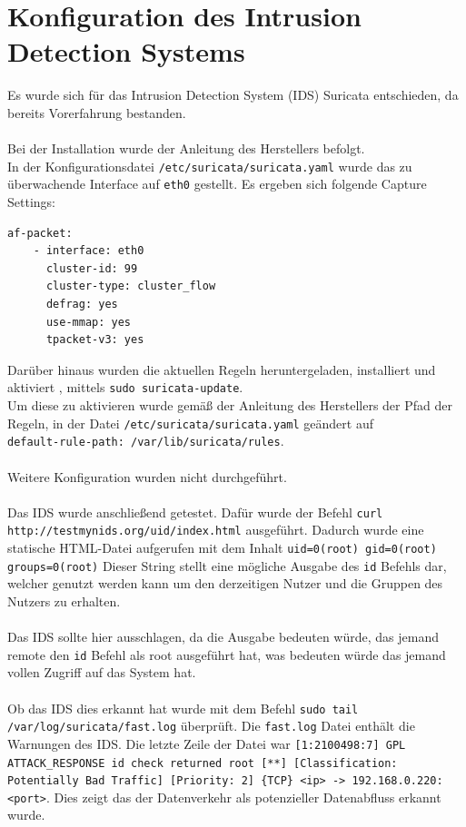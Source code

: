 \documentclass[
    a4paper,
    pagesize,
	pdftex,
    12pt,
]{scrartcl}
\begin{document}
\section{Konfiguration des Intrusion Detection Systems}\label{config-ids}
Es wurde sich für das Intrusion Detection System (IDS) Suricata entschieden, da bereits Vorerfahrung bestanden. \\ \\
Bei der Installation wurde der Anleitung des Herstellers \cite{suricata-quickstart} befolgt. \\
In der Konfigurationsdatei \lstinline[breaklines]|/etc/suricata/suricata.yaml| wurde das zu überwachende Interface auf \lstinline[breaklines]|eth0| gestellt. Es ergeben sich folgende Capture Settings:
\begin{lstlisting}[breaklines]
af-packet:
	- interface: eth0
	  cluster-id: 99
	  cluster-type: cluster_flow
	  defrag: yes
	  use-mmap: yes
	  tpacket-v3: yes
\end{lstlisting}
Darüber hinaus wurden die aktuellen Regeln heruntergeladen, installiert und aktiviert \cite{suricata-rulemanagement}, mittels \lstinline[breaklines]|sudo suricata-update|. \\
Um diese zu aktivieren wurde gemäß der Anleitung des Herstellers der Pfad der Regeln, in der Datei \lstinline[breaklines]|/etc/suricata/suricata.yaml| geändert auf \\ \lstinline[breaklines]|default-rule-path: /var/lib/suricata/rules|. \\ \\
Weitere Konfiguration wurden nicht durchgeführt. \\ \\
Das IDS wurde anschließend getestet. Dafür wurde der Befehl
\lstinline[breaklines]|curl http://testmynids.org/uid/index.html|
ausgeführt. Dadurch wurde eine statische HTML-Datei aufgerufen mit dem Inhalt 
\lstinline[breaklines]|uid=0(root) gid=0(root) groups=0(root)| 
Dieser String stellt eine mögliche Ausgabe des \lstinline[breaklines]|id| Befehls dar, welcher genutzt werden kann um den derzeitigen Nutzer und die Gruppen des Nutzers zu erhalten. \\ \\
Das IDS sollte hier ausschlagen, da die Ausgabe bedeuten würde, das jemand remote den \lstinline[breaklines]|id| Befehl als root ausgeführt hat, was bedeuten würde das jemand vollen Zugriff auf das System hat. \\ \\
Ob das IDS dies erkannt hat wurde mit dem Befehl
\lstinline[breaklines]|sudo tail /var/log/suricata/fast.log| 
überprüft. Die \lstinline[breaklines]|fast.log| Datei enthält die Warnungen des IDS. 
Die letzte Zeile der Datei war \lstinline[breaklines]|[1:2100498:7] GPL ATTACK_RESPONSE id check returned root [**] [Classification: Potentially Bad Traffic] [Priority: 2] {TCP} <ip> -> 192.168.0.220:<port>|. Dies zeigt das der Datenverkehr als potenzieller Datenabfluss erkannt wurde.
\end{document}
